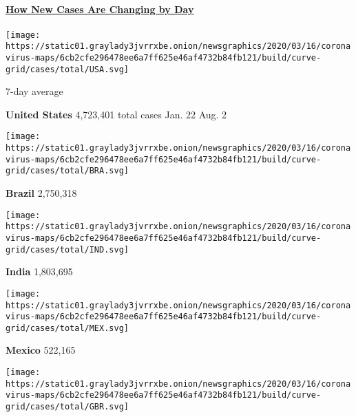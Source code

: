 \subsection{}

\hypertarget{how-new-cases-are-changing-by-day}{%
\paragraph{\texorpdfstring{\href{https://www.nytimes3xbfgragh.onion/interactive/2020/world/coronavirus-maps.html}{How
New Cases Are Changing by
Day}}{How New Cases Are Changing by Day}}\label{how-new-cases-are-changing-by-day}}

\href{https://www.nytimes3xbfgragh.onion/interactive/2020/us/coronavirus-us-cases.html}{}

\texttt{[image: https://static01.graylady3jvrrxbe.onion/newsgraphics/2020/03/16/coronavirus-maps/6cb2cfe296478ee6a7ff625e46af4732b84fb121/build/curve-grid/cases/total/USA.svg]}

7-day average

\textbf{United States} 4,723,401 total cases Jan. 22 Aug. 2
\href{https://www.nytimes3xbfgragh.onion/interactive/2020/world/americas/brazil-coronavirus-cases.html}{}

\texttt{[image: https://static01.graylady3jvrrxbe.onion/newsgraphics/2020/03/16/coronavirus-maps/6cb2cfe296478ee6a7ff625e46af4732b84fb121/build/curve-grid/cases/total/BRA.svg]}

\textbf{Brazil} 2,750,318
\href{https://www.nytimes3xbfgragh.onion/interactive/2020/world/asia/india-coronavirus-cases.html}{}

\texttt{[image: https://static01.graylady3jvrrxbe.onion/newsgraphics/2020/03/16/coronavirus-maps/6cb2cfe296478ee6a7ff625e46af4732b84fb121/build/curve-grid/cases/total/IND.svg]}

\textbf{India} 1,803,695
\href{https://www.nytimes3xbfgragh.onion/interactive/2020/world/americas/mexico-coronavirus-cases.html}{}

\texttt{[image: https://static01.graylady3jvrrxbe.onion/newsgraphics/2020/03/16/coronavirus-maps/6cb2cfe296478ee6a7ff625e46af4732b84fb121/build/curve-grid/cases/total/MEX.svg]}

\textbf{Mexico} 522,165
\href{https://www.nytimes3xbfgragh.onion/interactive/2020/world/europe/united-kingdom-coronavirus-cases.html}{}

\texttt{[image: https://static01.graylady3jvrrxbe.onion/newsgraphics/2020/03/16/coronavirus-maps/6cb2cfe296478ee6a7ff625e46af4732b84fb121/build/curve-grid/cases/total/GBR.svg]}

